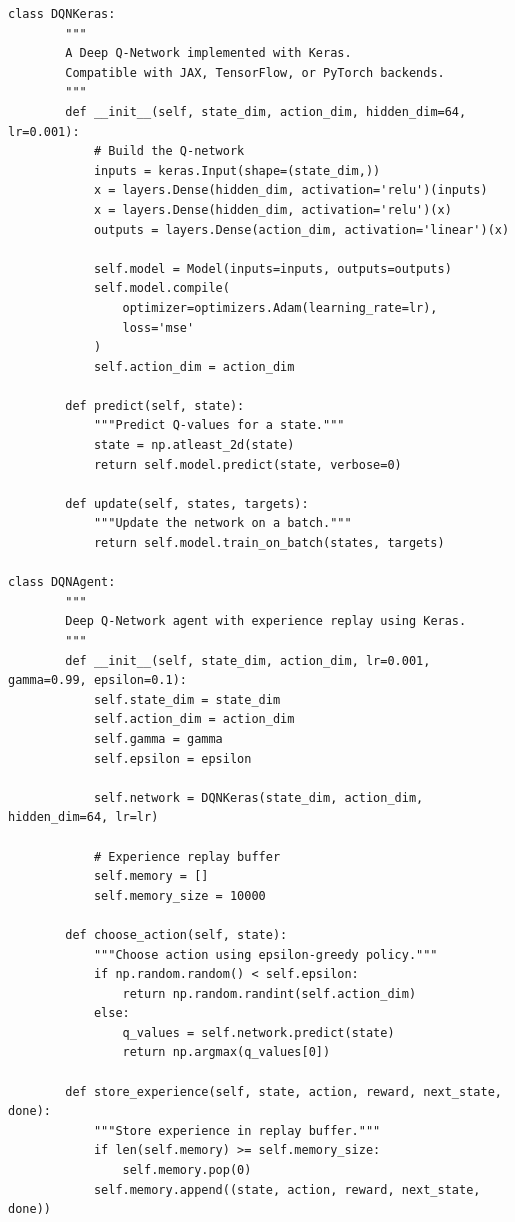 \begin{verbatim}
class DQNKeras:
        """
        A Deep Q-Network implemented with Keras.
        Compatible with JAX, TensorFlow, or PyTorch backends.
        """
        def __init__(self, state_dim, action_dim, hidden_dim=64, lr=0.001):
            # Build the Q-network
            inputs = keras.Input(shape=(state_dim,))
            x = layers.Dense(hidden_dim, activation='relu')(inputs)
            x = layers.Dense(hidden_dim, activation='relu')(x)
            outputs = layers.Dense(action_dim, activation='linear')(x)
            
            self.model = Model(inputs=inputs, outputs=outputs)
            self.model.compile(
                optimizer=optimizers.Adam(learning_rate=lr),
                loss='mse'
            )
            self.action_dim = action_dim
        
        def predict(self, state):
            """Predict Q-values for a state."""
            state = np.atleast_2d(state)
            return self.model.predict(state, verbose=0)
        
        def update(self, states, targets):
            """Update the network on a batch."""
            return self.model.train_on_batch(states, targets)
    
class DQNAgent:
        """
        Deep Q-Network agent with experience replay using Keras.
        """
        def __init__(self, state_dim, action_dim, lr=0.001, gamma=0.99, epsilon=0.1):
            self.state_dim = state_dim
            self.action_dim = action_dim
            self.gamma = gamma
            self.epsilon = epsilon
            
            self.network = DQNKeras(state_dim, action_dim, hidden_dim=64, lr=lr)
            
            # Experience replay buffer
            self.memory = []
            self.memory_size = 10000
        
        def choose_action(self, state):
            """Choose action using epsilon-greedy policy."""
            if np.random.random() < self.epsilon:
                return np.random.randint(self.action_dim)
            else:
                q_values = self.network.predict(state)
                return np.argmax(q_values[0])
        
        def store_experience(self, state, action, reward, next_state, done):
            """Store experience in replay buffer."""
            if len(self.memory) >= self.memory_size:
                self.memory.pop(0)
            self.memory.append((state, action, reward, next_state, done))
        

\end{verbatim}
